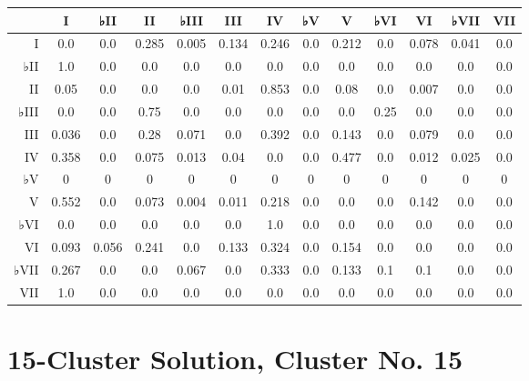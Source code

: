 \begin{table}[htbp]
\begin{minipage}{\linewidth}
\setlength{\tymax}{0.5\linewidth}
\centering
\small
\begin{tabulary}{\textwidth}{@{}RCCCCCCCCCCCC@{}} \toprule
&I&♭II&II&♭III&III&IV&♭V&V&♭VI&VI&♭VII&VII\\
\midrule
I&0.0&0.0&0.285&0.005&0.134&0.246&0.0&0.212&0.0&0.078&0.041&0.0\\
♭II&1.0&0.0&0.0&0.0&0.0&0.0&0.0&0.0&0.0&0.0&0.0&0.0\\
II&0.05&0.0&0.0&0.0&0.01&0.853&0.0&0.08&0.0&0.007&0.0&0.0\\
♭III&0.0&0.0&0.75&0.0&0.0&0.0&0.0&0.0&0.25&0.0&0.0&0.0\\
III&0.036&0.0&0.28&0.071&0.0&0.392&0.0&0.143&0.0&0.079&0.0&0.0\\
IV&0.358&0.0&0.075&0.013&0.04&0.0&0.0&0.477&0.0&0.012&0.025&0.0\\
♭V&0&0&0&0&0&0&0&0&0&0&0&0\\
V&0.552&0.0&0.073&0.004&0.011&0.218&0.0&0.0&0.0&0.142&0.0&0.0\\
♭VI&0.0&0.0&0.0&0.0&0.0&1.0&0.0&0.0&0.0&0.0&0.0&0.0\\
VI&0.093&0.056&0.241&0.0&0.133&0.324&0.0&0.154&0.0&0.0&0.0&0.0\\
♭VII&0.267&0.0&0.0&0.067&0.0&0.333&0.0&0.133&0.1&0.1&0.0&0.0\\
VII&1.0&0.0&0.0&0.0&0.0&0.0&0.0&0.0&0.0&0.0&0.0&0.0\\

\bottomrule

\end{tabulary}
\end{minipage}
\end{table}

\section{15-Cluster Solution, Cluster No. 15}
\label{15-clustersolutionclusterno.15}

